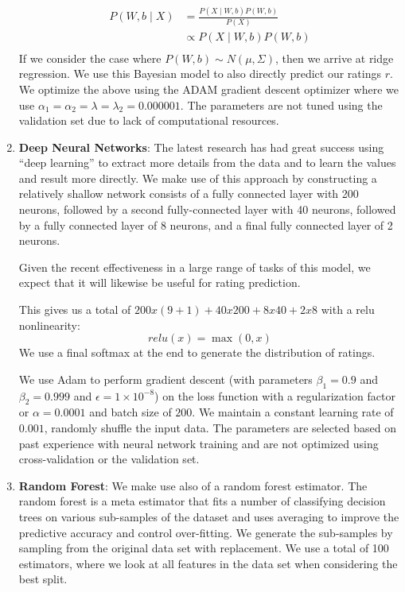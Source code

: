 \documentclass[letterpaper, 10 pt, conference]{ieeeconf}  %
\begin{document}
\begin{enumerate}
\begin{align*}
P(W,b \mid X) &= \frac{P(X \mid W,b)P(W,b)}{P(X)} \\
&\propto P(X \mid W,b)P(W,b) \\
\end{align*}
If we consider the case where $P(W,b) \sim N(\mu, \Sigma)$, then we arrive at ridge regression. We use this Bayesian model to also directly predict our ratings $r$. We optimize the above using the ADAM gradient descent optimizer where we use $\alpha_1 = \alpha_2 = \lambda = \lambda_2 = 0.000001$. The parameters are not tuned using the validation set due to lack of computational resources.

\item \textbf{Deep Neural Networks}: The latest research has had great success using ``deep learning'' to extract more details from the data and to learn the values and result more directly. We make use of this approach by constructing a relatively shallow network consists of a fully connected layer with 200 neurons, followed by a second fully-connected layer with 40 neurons, followed by a fully connected layer of 8 neurons, and a final fully connected layer of 2 neurons.

Given the recent effectiveness in a large range of tasks of this model, we expect that it will likewise be useful for rating prediction.

This gives us a total of $200x(9 + 1) + 40x200 + 8x40 + 2x8$ with a relu nonlinearity:
$$
relu(x) = \max(0,x)
$$
We use a final softmax at the end to generate the distribution of ratings.

We use Adam to perform gradient descent (with parameters $\beta_1 = 0.9$ and $\beta_2 = 0.999$ and $\epsilon = 1\times10^{-8}$) on the loss function with a regularization factor or $\alpha = 0.0001$ and batch size of $200$. We maintain a constant learning rate of $0.001$, randomly shuffle the input data. The parameters are selected based on past experience with neural network training and are not optimized using cross-validation or the validation set. 

\item \textbf{Random Forest}: We make use also of a random forest estimator. The random forest is a meta estimator that fits a number of classifying decision trees on various sub-samples of the dataset and uses averaging to improve the predictive accuracy and control over-fitting. We generate the sub-samples by sampling from the original data set with replacement. We use a total of 100 estimators, where we look at all features in the data set when considering the best split. 
\end{enumerate}
\end{document}

